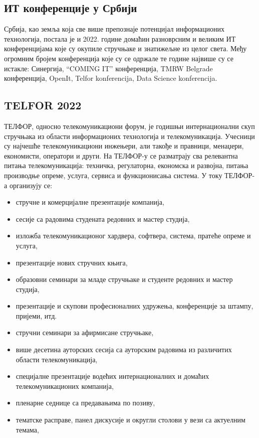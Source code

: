 \documentclass[12pt]{article}
\begin{document}
\subsection{ИТ конференције у Србији}
Србија, као земља која све више препознаје потенцијал информационих технологија, постала је и 2022. године домаћин разноврсним и великим ИТ конференцијама које су окупиле стручњаке и знатижељне из целог света. Међу огромним бројем конференција које су се одржале те године највише су се истакле: Синергија, “COMING IT” конференција, TMRW Belgrade конференција, OpenIt, Telfor konferencija, Data Science konferencija.

\subsection{TELFOR 2022}
ТЕЛФОР, односно телекомуникациони форум, је годишњи интернационални скуп стручњака из области информационих технологија и телекомуникација. Учесници су најчешће телекомуникациони инжењери, али такође и правници, менаџери, економисти, оператори и други. На ТЕЛФОР-у се разматрају сва релевантна питања телекомуникација: техничка, регулаторна, економска и развојна, питања производње опреме, услуга, сервиса и функционисања система.
У току ТЕЛФОР-а организују се:
\begin{itemize}
	\item стручне и комерцијалне презентације компанија,
	\item сесије са радовима студената редовних и мастер студија,
	\item изложба телекомуникационог хардвера, софтвера, система, пратеће опреме и услуга, 
	\item презентације нових стручних књига,
	\item образовни семинари за младе стручњаке и студенте редовних и мастер студија,
	\item презентације и скупови професионалних удружења, конференције за штампу, пријеми, итд. 
	\item стручни семинари за афирмисане стручњаке, 
	\item више десетина ауторских сесија са ауторским радовима из различитих области телекомуникација, 
	\item специјалне презентације водећих интернационалних и домаћих телекомуникационих компанија,
	\item пленарне седнице са предавањима по позиву,
	\item тематске расправе, панел дискусије и округли столови у вези са актуелним темама,
\end{itemize}
\end{document}

